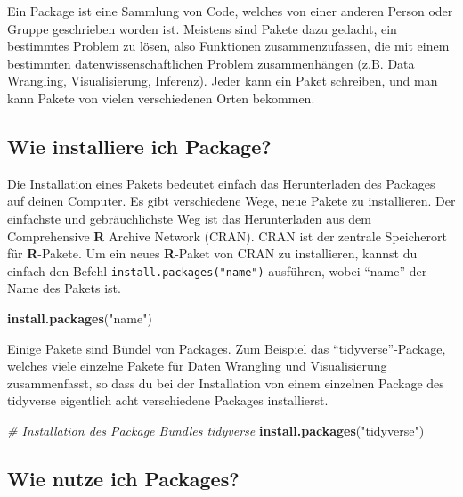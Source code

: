 \documentclass[
]{book}
\newenvironment{Shaded}{\begin{snugshade}}{\end{snugshade}}
\newcommand{\CommentTok}[1]{\textcolor[rgb]{0.56,0.35,0.01}{\textit{#1}}}
\newcommand{\KeywordTok}[1]{\textcolor[rgb]{0.13,0.29,0.53}{\textbf{#1}}}
\newcommand{\NormalTok}[1]{#1}
\newcommand{\StringTok}[1]{\textcolor[rgb]{0.31,0.60,0.02}{#1}}
\begin{document}
Ein Package ist eine Sammlung von Code, welches von einer anderen Person oder Gruppe geschrieben worden ist. Meistens sind Pakete dazu gedacht, ein bestimmtes Problem zu lösen, also Funktionen zusammenzufassen, die mit einem bestimmten datenwissenschaftlichen Problem zusammenhängen (z.B. Data Wrangling, Visualisierung, Inferenz). Jeder kann ein Paket schreiben, und man kann Pakete von vielen verschiedenen Orten bekommen.

\hypertarget{wie-installiere-ich-package}{%
\subsection{Wie installiere ich Package?}\label{wie-installiere-ich-package}}

Die Installation eines Pakets bedeutet einfach das Herunterladen des Packages auf deinen Computer. Es gibt verschiedene Wege, neue Pakete zu installieren. Der einfachste und gebräuchlichste Weg ist das Herunterladen aus dem Comprehensive \textbf{R} Archive Network (CRAN). CRAN ist der zentrale Speicherort für \textbf{R}-Pakete. Um ein neues \textbf{R}-Paket von CRAN zu installieren, kannst du einfach den Befehl \texttt{install.packages("name")} ausführen, wobei ``name'' der Name des Pakets ist.

\begin{Shaded}
\begin{Highlighting}[]
\KeywordTok{install.packages}\NormalTok{(}\StringTok{"name"}\NormalTok{)}
\end{Highlighting}
\end{Shaded}

Einige Pakete sind Bündel von Packages. Zum Beispiel das ``tidyverse''-Package, welches viele einzelne Pakete für Daten Wrangling und Visualisierung zusammenfasst, so dass du bei der Installation von einem einzelnen Package des tidyverse eigentlich acht verschiedene Packages installierst.

\begin{Shaded}
\begin{Highlighting}[]
\CommentTok{# Installation des Package Bundles tidyverse}
  \KeywordTok{install.packages}\NormalTok{(}\StringTok{"tidyverse"}\NormalTok{)}
\end{Highlighting}
\end{Shaded}

\hypertarget{wie-nutze-ich-packages}{%
\subsection{Wie nutze ich Packages?}\label{wie-nutze-ich-packages}}
\end{document}
